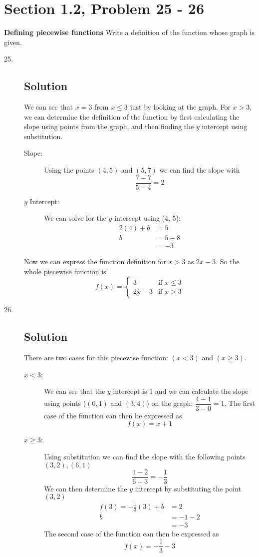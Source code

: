 \documentclass{article}
\newcommand{\problem}[2]{\vspace{5ex}\section*{Section #1, Problem #2}}
\newcommand{\solution}{\subsection*{Solution}}
\begin{document}
\problem{1.2}{25 \-- 26}
\textbf{Defining piecewise functions} Write a definition of the function whose graph is given.

\begin{description}
  \item[25.]
  \solution{}
  We can see that $x = 3$ from $x \leq 3$ just by looking at the graph. For $x > 3$, we can determine
  the definition of the function by first calculating the slope using points from the graph, and then
  finding the $y$ intercept using substitution.

  \begin{description}
    \item[Slope:] Using the points $(4, 5)$ and $(5, 7)$ we can find the slope with
    \[
      \dfrac{7-7}{5-4} = 2
    \]
    \item[$y$ Intercept:] We can solve for the $y$ intercept using (4, 5):
      \begin{align*}
        2(4) + b &= 5 \\
               b &= 5 - 8 \\
                 &= -3
      \end{align*}
  \end{description}
  Now we can express the function definition for $x > 3$ as $2x -3$. So the whole piecewise function is
  \[
    f(x) = \begin{cases}
             3   &\text{if } x \leq 3 \\
             2x-3 &\text{if } x > 3
           \end{cases}
  \]

  \item[26.]
  \solution{}
  There are two cases for this piecewise function: $(x < 3)$ and $(x \geq 3)$.
  \begin{description}
  \item[$x<3$:] We can see that the $y$ intercept is $1$ and we can calculate the slope using points
    ($(0,1)$ and $(3,4)$) on the graph: $\dfrac{4-1}{3-0} = 1$. The first case of the function can
    then be expressed as
    \[
      f(x) = x + 1
    \]

  \item[$x\geq3$:] Using substitution we can find the slope with the following points $(3,2), (6,1)$
    \[
      \dfrac{1-2}{6-3} = -\dfrac{1}{3}
    \]
    We can then determine the $y$ intercept by substituting the point $(3,2)$
    \begin{align*}
      f(3) = -\frac{1}{3}(3) + b &= 2 \\
                               b &= -1 -2 \\
                                 &= -3
    \end{align*}
    The second case of the function can then be expressed as
    \[
      f(x) = -\frac{1}{3} -3
    \]


\end{description}
\end{description}
\end{document}
